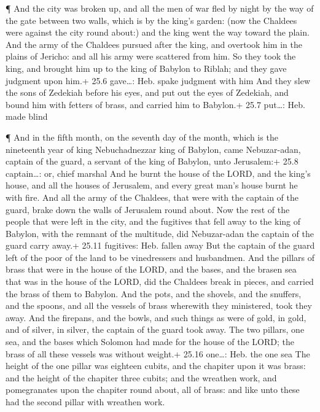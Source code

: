  ¶ And the city was broken up, and all the men of war fled
by night by the way of the gate between two walls, which is by the
king's garden: (now the Chaldees were against the city round about:) and
the king went the way toward the plain.  And the army of the
Chaldees pursued after the king, and overtook him in the plains of
Jericho: and all his army were scattered from him.  So they
took the king, and brought him up to the king of Babylon to Riblah; and
they gave judgment upon him.+ 25.6 gave\ldots: Heb. spake judgment with
him  And they slew the sons of Zedekiah before his eyes, and
put out the eyes of Zedekiah, and bound him with fetters of brass, and
carried him to Babylon.+ 25.7 put\ldots: Heb. made blind

 ¶ And in the fifth month, on the seventh day of the month,
which is the nineteenth year of king Nebuchadnezzar king of Babylon,
came Nebuzar-adan, captain of the guard, a servant of the king of
Babylon, unto Jerusalem:+ 25.8 captain\ldots: or, chief marshal
 And he burnt the house of the LORD, and the king's house,
and all the houses of Jerusalem, and every great man's house burnt he
with fire.  And all the army of the Chaldees, that were
with the captain of the guard, brake down the walls of Jerusalem round
about.  Now the rest of the people that were left in the
city, and the fugitives that fell away to the king of Babylon, with the
remnant of the multitude, did Nebuzar-adan the captain of the guard
carry away.+ 25.11 fugitives: Heb. fallen away  But the
captain of the guard left of the poor of the land to be vinedressers and
husbandmen.  And the pillars of brass that were in the
house of the LORD, and the bases, and the brasen sea that was in the
house of the LORD, did the Chaldees break in pieces, and carried the
brass of them to Babylon.  And the pots, and the shovels,
and the snuffers, and the spoons, and all the vessels of brass wherewith
they ministered, took they away.  And the firepans, and the
bowls, and such things as were of gold, in gold, and of silver, in
silver, the captain of the guard took away.  The two
pillars, one sea, and the bases which Solomon had made for the house of
the LORD; the brass of all these vessels was without weight.+ 25.16
one\ldots: Heb. the one sea  The height of the one pillar
was eighteen cubits, and the chapiter upon it was brass: and the height
of the chapiter three cubits; and the wreathen work, and pomegranates
upon the chapiter round about, all of brass: and like unto these had the
second pillar with wreathen work.

